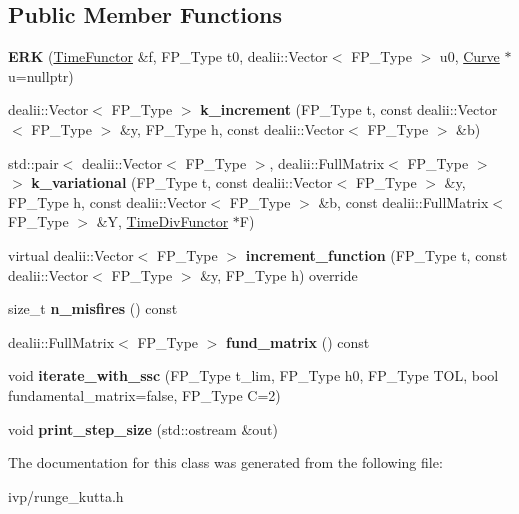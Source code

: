 \subsection*{Public Member Functions}
\begin{DoxyCompactItemize}
\item 
\mbox{\label{classERK_a9616104111b751fee7c46123878275ac}} 
{\bfseries E\+RK} (\hyperlink{classTimeFunctor}{Time\+Functor} \&f, F\+P\+\_\+\+Type t0, dealii\+::\+Vector$<$ F\+P\+\_\+\+Type $>$ u0, \hyperlink{classCurve}{Curve} $\ast$u=nullptr)
\item 
\mbox{\label{classERK_a523fbb19deff344d93dba835c4daf6c0}} 
dealii\+::\+Vector$<$ F\+P\+\_\+\+Type $>$ {\bfseries k\+\_\+increment} (F\+P\+\_\+\+Type t, const dealii\+::\+Vector$<$ F\+P\+\_\+\+Type $>$ \&y, F\+P\+\_\+\+Type h, const dealii\+::\+Vector$<$ F\+P\+\_\+\+Type $>$ \&b)
\item 
\mbox{\label{classERK_a55a3f3ae9207da57e0a6aa301a2f4b27}} 
std\+::pair$<$ dealii\+::\+Vector$<$ F\+P\+\_\+\+Type $>$, dealii\+::\+Full\+Matrix$<$ F\+P\+\_\+\+Type $>$ $>$ {\bfseries k\+\_\+variational} (F\+P\+\_\+\+Type t, const dealii\+::\+Vector$<$ F\+P\+\_\+\+Type $>$ \&y, F\+P\+\_\+\+Type h, const dealii\+::\+Vector$<$ F\+P\+\_\+\+Type $>$ \&b, const dealii\+::\+Full\+Matrix$<$ F\+P\+\_\+\+Type $>$ \&Y, \hyperlink{classTimeDivFunctor}{Time\+Div\+Functor} $\ast$F)
\item 
\mbox{\label{classERK_a11029cb0aa55b9ac17b6c101b8b1a24a}} 
virtual dealii\+::\+Vector$<$ F\+P\+\_\+\+Type $>$ {\bfseries increment\+\_\+function} (F\+P\+\_\+\+Type t, const dealii\+::\+Vector$<$ F\+P\+\_\+\+Type $>$ \&y, F\+P\+\_\+\+Type h) override
\item 
\mbox{\label{classERK_ae3f71b3f5364ffcab63a715d95adb911}} 
size\+\_\+t {\bfseries n\+\_\+misfires} () const
\item 
\mbox{\label{classERK_ac8835e6d68d903c7111da0b077821e3b}} 
dealii\+::\+Full\+Matrix$<$ F\+P\+\_\+\+Type $>$ {\bfseries fund\+\_\+matrix} () const
\item 
\mbox{\label{classERK_a9537f676f3d8df72748a21e3af707474}} 
void {\bfseries iterate\+\_\+with\+\_\+ssc} (F\+P\+\_\+\+Type t\+\_\+lim, F\+P\+\_\+\+Type h0, F\+P\+\_\+\+Type T\+OL, bool fundamental\+\_\+matrix=false, F\+P\+\_\+\+Type C=2)
\item 
\mbox{\label{classERK_a6057b70fbd97bbe2e5b2d0233aef46a4}} 
void {\bfseries print\+\_\+step\+\_\+size} (std\+::ostream \&out)
\end{DoxyCompactItemize}


The documentation for this class was generated from the following file\+:\begin{DoxyCompactItemize}
\item 
ivp/runge\+\_\+kutta.\+h\end{DoxyCompactItemize}
